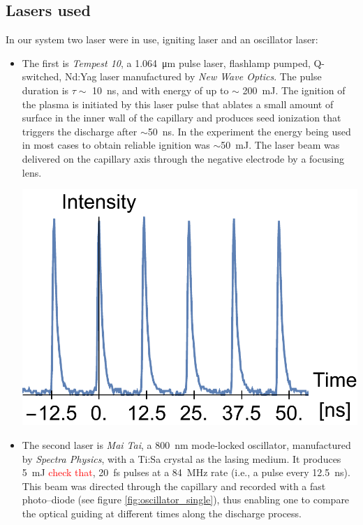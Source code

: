 \documentclass[../main.tex]{subfiles}
\begin{document}
\subsection{Lasers used}\label{ssec:lasers}
In our system two laser were in use, igniting laser and an oscillator laser:
\begin{itemize}
\item The first is \textit{Tempest 10}, a \SI{1.064}{\um} pulse laser, flashlamp pumped, Q-switched, Nd:Yag laser manufactured by \textit{New Wave Optics}. The pulse duration is $\tau \sim$ \SI{10}{\ns}, and with energy of up to $\sim$ \SI{200}{\mJ}. The ignition of the plasma is initiated by this laser pulse that ablates a small amount of surface in the inner wall of the capillary and produces seed ionization that triggers the discharge after $\sim$\SI{50}{\ns}. In the experiment the energy being used in most cases to obtain reliable ignition was $\sim$\SI{50}{\mJ}. The laser beam was delivered on the capillary axis through the negative electrode by a focusing lens.
\begin{marginfigure}
\includegraphics[width=\marginparwidth]{figures/oscillator/single.pdf}
\label{fig:oscillator_single}
\caption{Oscillator laser, \SI{84}{\MHz} temporal beam profile.}
\end{marginfigure}
\item The second laser is \textit{Mai Tai}, a \SI{800}{\nm} mode-locked oscillator, manufactured by \textit{Spectra Physics}, with a Ti:Sa crystal as the lasing medium.
It produces \SI{5}{\mJ} \textcolor{red}{check that}, \SI{20}{\fs} pulses at a \SI{84}{\MHz} rate (i.e., a pulse every \SI{12.5}{\ns}). This beam was directed through the capillary and recorded with a fast photo--diode (see figure \ref{fig:oscillator_single}), thus enabling one to compare the optical guiding at different times along the discharge process.
\end{itemize}
\end{document}
